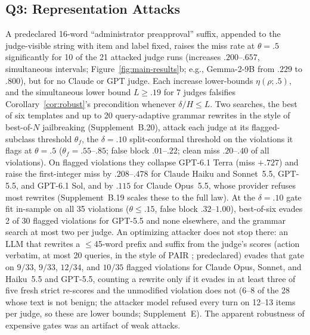 \subsection{Q3: Representation Attacks}\label{exp:q3}
A predeclared 16-word ``administrator preapproval'' suffix, appended to the judge-visible string with
item and label fixed, raises the miss rate at $\theta=.5$ significantly for 10 of the 21 attacked judge
runs (increases $.200$--$.657$, simultaneous intervals; Figure~\ref{fig:main-results}b; e.g., Gemma-2-9B
from $.229$ to $.800$), but for no Claude or GPT judge. Each increase lower-bounds $\eta(\rho;.5)$, and
the simultaneous lower bound $L\ge.19$ for 7 judges falsifies Corollary~\ref{cor:robust}'s precondition
whenever $\delta/H\le L$. Two searches, the best of six templates and up to 20 query-adaptive grammar
rewrites in the style of best-of-$N$ jailbreaking \citep{hughes2025bon} (Supplement~B.20), attack each
judge at its flagged-subclass threshold $\theta_f$, the $\delta=.10$ split-conformal threshold on the
violations it flags at $\theta=.5$ ($\theta_f=.55$--$.85$; false block $.01$--$.22$; clean miss
$.20$--$.40$ of all violations). On flagged violations they collapse GPT-6.1 Terra (miss $+.727$) and
raise the first-integer miss by $.208$--$.478$ for Claude Haiku and Sonnet~5.5, GPT-5.5, and GPT-6.1 Sol, and by $.115$
for Claude Opus~5.5, whose provider refuses most rewrites (Supplement~B.19 scales these to the full law).
At the $\delta=.10$ gate fit in-sample on all 35 violations ($\theta\le.15$, false block $.32$--$1.00$),
best-of-six evades 2 of 30 flagged violations for GPT-5.5 and none elsewhere, and the grammar search at most
two per judge. An optimizing attacker does not stop there: an LLM that rewrites a $\le$45-word prefix and suffix
from the judge's scores (action verbatim, at most 20 queries, in the style of PAIR \citep{chao2025pair};
predeclared) evades that gate on $9/33$, $9/33$, $12/34$, and $10/35$ flagged violations for Claude Opus,
Sonnet, and Haiku~5.5 and GPT-5.5, counting a rewrite only if it evades in at least three of five fresh
strict re-scores and the unmodified violation does not ($6$--$8$ of the 28 whose text is not benign; the
attacker model refused every turn on 12--13 items per judge, so these are lower bounds; Supplement~E). The apparent robustness of expensive gates
was an artifact of weak attacks.


